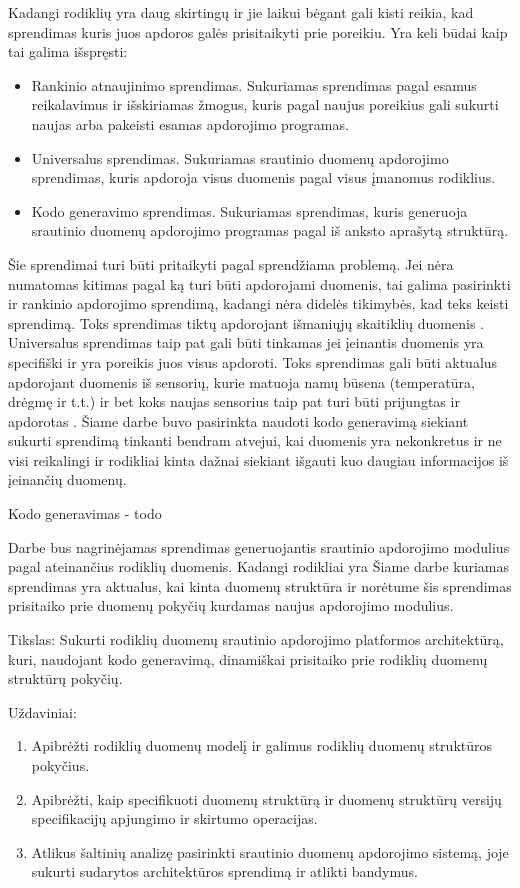 \documentclass{VUMIFPSbakalaurinis}
\begin{document}
\par
Kadangi rodiklių yra daug skirtingų ir jie laikui bėgant gali kisti reikia, kad sprendimas kuris juos apdoros galės prisitaikyti prie poreikiu. Yra keli būdai kaip tai galima išspręsti:
\begin{itemize}
    \item Rankinio atnaujinimo sprendimas. Sukuriamas sprendimas pagal esamus reikalavimus ir išskiriamas žmogus, kuris pagal naujus poreikius gali sukurti naujas arba pakeisti esamas apdorojimo programas. 
    \item Universalus sprendimas. Sukuriamas srautinio duomenų apdorojimo sprendimas, kuris apdoroja visus duomenis pagal visus įmanomus rodiklius.
    \item Kodo generavimo sprendimas. Sukuriamas sprendimas, kuris generuoja srautinio duomenų apdorojimo programas pagal iš anksto aprašytą struktūrą.  
\end{itemize}   
Šie sprendimai turi būti pritaikyti pagal sprendžiama problemą. Jei nėra numatomas kitimas pagal ką turi būti apdorojami duomenis, tai galima pasirinkti ir rankinio apdorojimo sprendimą, kadangi nėra didelės tikimybės, kad teks keisti sprendimą. Toks sprendimas tiktų apdorojant išmaniųjų skaitiklių duomenis \cite{skaitikliai}. Universalus sprendimas taip pat gali būti tinkamas jei įeinantis duomenis yra specifiški ir yra poreikis juos visus apdoroti. Toks sprendimas gali būti aktualus apdorojant duomenis iš sensorių, kurie matuoja namų būsena (temperatūra, drėgmę ir t.t.) ir bet koks naujas sensorius taip pat turi būti prijungtas ir apdorotas \cite{yang2017iot}. Šiame darbe buvo pasirinkta naudoti kodo generavimą siekiant sukurti sprendimą tinkanti bendram atvejui, kai duomenis yra nekonkretus ir ne visi reikalingi ir rodikliai kinta dažnai siekiant išgauti kuo daugiau informacijos iš įeinančių duomenų. \par
Kodo generavimas - todo \par
Darbe bus nagrinėjamas sprendimas generuojantis srautinio apdorojimo modulius pagal ateinančius rodiklių duomenis. 
Kadangi rodikliai yra  
Šiame darbe kuriamas sprendimas yra aktualus, kai kinta duomenų struktūra ir norėtume šis sprendimas prisitaiko 
prie duomenų pokyčių kurdamas naujus apdorojimo modulius.


Tikslas: Sukurti rodiklių duomenų srautinio apdorojimo platformos architektūrą, kuri, naudojant kodo generavimą, dinamiškai prisitaiko prie rodiklių duomenų struktūrų pokyčių.

Uždaviniai:
\begin{enumerate}
    \item Apibrėžti rodiklių duomenų modelį ir galimus rodiklių duomenų struktūros pokyčius.
    \item Apibrėžti, kaip specifikuoti duomenų struktūrą ir duomenų struktūrų versijų specifikacijų apjungimo ir skirtumo operacijas.
    \item Atlikus šaltinių analizę pasirinkti srautinio duomenų apdorojimo sistemą, joje sukurti sudarytos architektūros sprendimą ir atlikti bandymus.
\end{enumerate}
\end{document}
